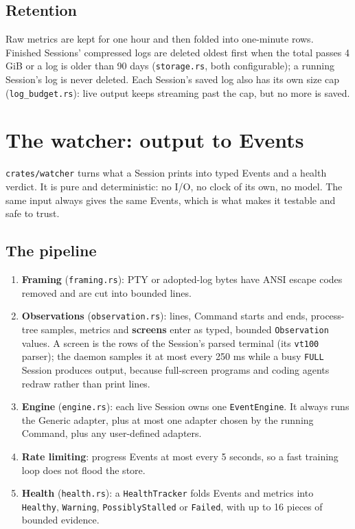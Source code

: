 \section{\texorpdfstring{Retention}{Retention}}

Raw metrics are kept for one hour and then folded into one-minute rows. Finished Sessions' compressed logs are deleted oldest first when the total passes 4 GiB or a log is older than 90 days (\texttt{storage.\allowbreak{}rs}, both configurable); a running Session's log is never deleted. Each Session's saved log also has its own size cap (\texttt{log\_\allowbreak{}budget.\allowbreak{}rs}): live output keeps streaming past the cap, but no more is saved.

\chapter{\texorpdfstring{The watcher: output to Events}{The watcher: output to Events}}

\texttt{crates/\allowbreak{}watcher} turns what a Session prints into typed Events and a health verdict. It is pure and deterministic: no I/O, no clock of its own, no model. The same input always gives the same Events, which is what makes it testable and safe to trust.

\section{\texorpdfstring{The pipeline}{The pipeline}}

\begin{enumerate}
\item \textbf{Framing} (\texttt{framing.\allowbreak{}rs}): PTY or adopted-log bytes have ANSI escape codes removed and are cut into bounded lines.
\item \textbf{Observations} (\texttt{observation.\allowbreak{}rs}): lines, Command starts and ends, process-tree samples, metrics and \textbf{screens} enter as typed, bounded \texttt{Observation} values. A screen is the rows of the Session's parsed terminal (its \texttt{vt100} parser); the daemon samples it at most every 250 ms while a busy \texttt{FULL} Session produces output, because full-screen programs and coding agents redraw rather than print lines.
\item \textbf{Engine} (\texttt{engine.\allowbreak{}rs}): each live Session owns one \texttt{EventEngine}. It always runs the Generic adapter, plus at most one adapter chosen by the running Command, plus any user-defined adapters.
\item \textbf{Rate limiting}: progress Events at most every 5 seconds, so a fast training loop does not flood the store.
\item \textbf{Health} (\texttt{health.\allowbreak{}rs}): a \texttt{HealthTracker} folds Events and metrics into \texttt{Healthy}, \texttt{Warning}, \texttt{PossiblyStalled} or \texttt{Failed}, with up to 16 pieces of bounded evidence.
\end{enumerate}

